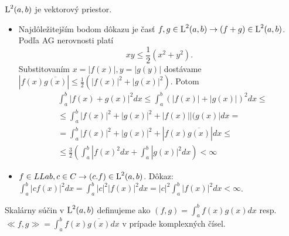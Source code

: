 \begin{lema}
$\mbox{L}^2(a,b)$ je vektorový priestor.
\end{lema}

\begin{dokaz}
\begin{itemize}
\item
Najdôležitejším bodom dôkazu je časť $f,g \in \mbox{L}^2(a,b) \rightarrow (f+g)\in \mbox{L}^2(a,b)$.
Podľa AG nerovnosti platí 
\begin{equation*}
    xy \le \frac{1}{2}(x^2 + y^2).
\end{equation*}
Substitovaním $x=|f(x)|,y=|g(y)|$ dostávame
$|f(x)\overline{g(x)}| \le \frac{1}{2} 
( |f(x)|^2 + |g(x)|^2) $.
 Potom
 \begin{eqnarray*}
    & \int_a^b |f(x)+g(x)|^2 dx  \le
    \int_a^b (|f(x)|+|g(x)|)^2 dx \le \\    
    & \le  \int_a^b |f(x)|^2 + |g(x)|^2 + |f(x)||(g(x)| dx = \\
    & = \int_a^b |f(x)|^2 + |g(x)|^2 + |f(x) \overline{g(x)}| dx \le \\
    & \le \frac{3}{2}( \int_a^b |f(x)^2 dx + \int_a^b |g(x)|^2 dx)
    < \infty
 \end{eqnarray*} 
\item
$f \in LLab, c\in C \rightarrow (c.f) \in \mbox{L}^2(a,b)$.
Dôkaz: $\int_a^b |cf(x)|^2 dx = \int_a^b |c|^2 |f(x)|^2 dx =
 |c|^2 \int_a^b |f(x)|^2 dx < \infty$.
\end{itemize}
\end{dokaz}

\begin{definicia}
 Skalárny súčin v $\mbox{L}^2(a,b)$ definujeme ako
  $(f,g) = \int_a^b f(x) g(x) dx$ resp. 
  $\ll f,g \gg = \int_a^b f(x) \overline{g(x)} dx$ v prípade
  komplexných čísel.
\end{definicia}
